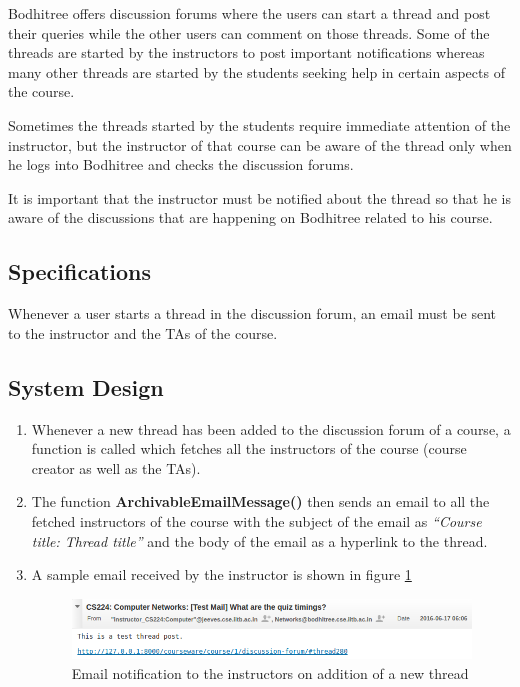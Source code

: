 \hspace{0.35cm} Bodhitree offers discussion forums where the users can start a thread and post their queries while the other users can comment on those threads. Some of the threads are started by the instructors to post important notifications whereas many other threads are started by the students seeking help in certain aspects of the course.
\par Sometimes the threads started by the students require immediate attention of the instructor, but the instructor of that course can be aware of the thread only when he logs into Bodhitree and checks the discussion forums.
\par It is important that the instructor must be notified about the thread so that he is aware of the discussions that are happening on Bodhitree related to his course.

\subsection*{Specifications}

\hspace{0.35cm} Whenever a user starts a thread in the discussion forum, an email must be sent to the instructor and the TAs of the course.

\subsection*{System Design}

\begin{enumerate}
	\item Whenever a new thread has been added to the discussion forum of a course, a function is called which fetches all the instructors of the course (course creator as well as the TAs).
	\item The function \textbf{ArchivableEmailMessage()} then sends an email to all the fetched instructors of the course with the subject of the email as \textit{``Course title: Thread title''} and the body of the email as a hyperlink to the thread.
	\item A sample email received by the instructor is shown in figure \ref{fig:instructor-email}
	\begin{figure}[h]
	\centering
	\includegraphics[width=0.95\linewidth]{./media/instructors_mail}
	\caption{Email notification to the instructors on addition of a new thread}
	\label{fig:instructor-email}
	\end{figure}
	
\end{enumerate}